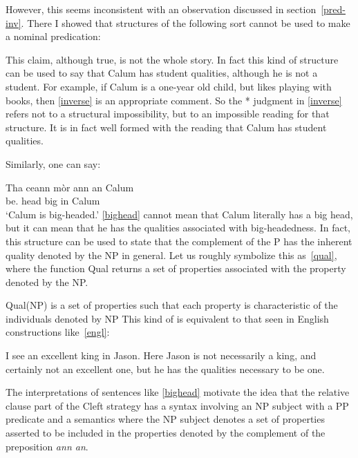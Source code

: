 \documentclass[output=paper]{langsci/langscibook}
\begin{document}
However, this seems inconsistent with an observation discussed in
section~\eqref{pred-inv}. There I showed that structures of the following sort
cannot be used to make a nominal predication:

\ea {}
    \label{inverse}
\z
This claim, although true, is not the whole story. In fact this kind
of structure can be used to say that Calum has student qualities, although he
is not a student. For example, if Calum is a one-year old child, but likes
playing with books, then \eqref{inverse} is an appropriate comment. So the * judgment in \eqref{inverse} refers not to a structural impossibility, but to an impossible reading for that structure. It is in fact well formed with the reading that Calum has student qualities.

Similarly, one can say:

\ea {} \label{bighead}
\sn \gll  Tha ceann m\`or {ann an} Calum\\
be.\Prs{} head big in Calum\\
\glt  `Calum is big-headed.'
\z
\eqref{bighead} cannot mean that Calum literally has a big head, but it can mean
that he has the qualities associated with big-headedness. In fact, this
structure can be used to state that the complement of the P has the inherent
quality denoted by the NP in general. Let us roughly symbolize this
as~\eqref{qual}, where the function Qual returns a set of properties associated
with the property denoted by the NP.

\ea \label{qual} Qual(NP) is a set of properties such that each property is characteristic of the individuals denoted by NP
\z
This kind of  is equivalent to that seen in English constructions
like~\eqref{engl}:

\ea \label{engl} I see an excellent king in Jason. \z
Here Jason is not necessarily a king, and certainly not an excellent one, but
he has the qualities necessary to be one.

The interpretations of sentences like \eqref{bighead} motivate the idea that the relative clause part of the Cleft strategy has a syntax involving an NP subject with a PP predicate and a semantics where the NP subject denotes a set of properties asserted to be included in the properties denoted by the complement of the preposition \emph{ann an}.
\end{document}

